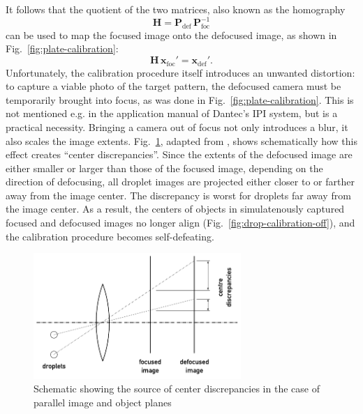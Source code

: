 \documentclass[11.5pt]{book}
\newcommand*{\figref}[1]{Fig.~\ref{#1}}
\begin{document}
It follows that the quotient of the two matrices, also known as the homography
\begin{equation}
    \mathbf{H} = \mathbf{P}_\text{def} \, \mathbf{P}_\text{foc}^{-1}
\end{equation}
can be used to map the focused image onto the defocused image, as shown in \figref{fig:plate-calibration}:
\begin{equation}
    \mathbf{H}\, \mathbf{x}_\text{foc}' = \mathbf{x}_\text{def}'.
    \label{homography-definition}
\end{equation}
Unfortunately, the calibration procedure itself introduces an unwanted
distortion: to capture a viable photo of the target pattern, the defocused
camera must be temporarily brought into focus, as was done in
\figref{fig:plate-calibration}. This is not mentioned e.g. in the
application manual of Dantec's IPI system, but is a practical necessity.
Bringing a camera out of focus not only introduces a blur, it also scales the
image extents. \figref{fig:discrepancy}, adapted from \citet{Hardalupas10},
shows schematically how this effect creates ``center discrepancies''. Since the
extents of the defocused image are either smaller or larger than those of the
focused image, depending on the direction of defocusing, all droplet images are
projected either closer to or farther away from the image center. The
discrepancy is worst for droplets far away from the image center. As a result,
the centers of objects in simulatenously captured focused and defocused images
no longer align (\figref{fig:drop-calibration-off}), and the calibration
procedure becomes self-defeating.

\begin{figure}
\centering
\includegraphics[width=0.7\textwidth]{img/orb/discrepancy.pdf}
\caption{Schematic showing the source of center discrepancies in the case of
parallel image and object planes \label{fig:discrepancy}}
\end{figure}
\end{document}
